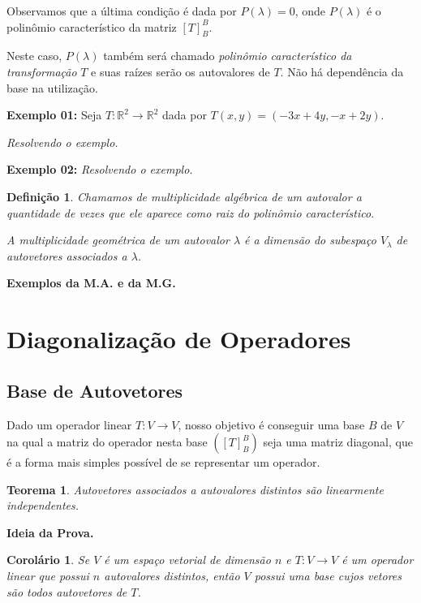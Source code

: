 \documentclass[oneside,a4paper,12pt]{article}
\newtheorem{theorem}{Teorema}[section]
\newtheorem{definition}{Definição}[section]
\newtheorem{corollary}{Corolário}[section]
\begin{document}
Observamos que a última condição é dada por $P(\lambda) = 0$, onde $P(\lambda)$ é o polinômio característico da matriz $[T]_{B}^{B}$.

Neste caso, $P(\lambda)$ também será chamado \emph{polinômio característico da transformação } $T$ e suas raízes serão os autovalores de $T$. Não há dependência da base na utilização.

{\bf Exemplo 01: } Seja $T:\mathbb{R}^2 \rightarrow \mathbb{R}^2$ dada por $T(x,y) = (-3x + 4y, -x + 2y)$.

\vspace{50pt}
\emph{Resolvendo o exemplo.}

{\bf Exemplo 02: }
\vspace{50pt}
\emph{Resolvendo o exemplo.}

\begin{definition}
	Chamamos de \emph{multiplicidade algébrica de um autovalor} a quantidade de vezes que ele aparece como raiz do polinômio característico.
	
	A \emph{multiplicidade geométrica de um autovalor $\lambda$} é a dimensão do subespaço $V_\lambda$ de autovetores associados a $\lambda$.
\end{definition}

{\bf Exemplos da M.A. e da M.G.}

\newpage
\section{Diagonalização de Operadores}


\subsection{Base de Autovetores}

Dado um operador linear $T:V \rightarrow V$, nosso objetivo é conseguir uma base $B$ de $V$ na qual a matriz do operador nesta base $([T]_{B}^{B})$ seja uma matriz diagonal, que é a forma mais simples possível de se representar um operador.

\begin{theorem}
	Autovetores associados a autovalores distintos são linearmente independentes.
\end{theorem}

{\bf Ideia da Prova.}
\vspace{50pt}

\begin{corollary}
	Se $V$ é um espaço vetorial de dimensão $n$ e $T:V \rightarrow V$ é um operador linear que possui $n$ autovalores distintos, então $V$ possui uma base cujos vetores são todos autovetores de $T$.
\end{corollary}
\end{document}
